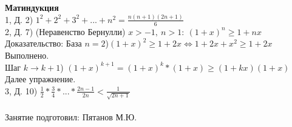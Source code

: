 \documentclass[a4paper]{article}
\begin{document}
\textbf{Матиндукция}\\
1, Д. 2) $1^2 + 2^2 + 3^2 + ... + n^2 = \frac{n(n+1)(2n+1)}{6}$\\
2, Д. 7) (Неравенство Бернулли) $x > -1,\ n > 1 :\ (1+x)^n \geqslant 1+nx$\\
Доказательство:
База $n=2$)$(1+x)^2 \geqslant 1+2x \Leftrightarrow 1+2x+x^2 \geqslant 1+2x$ Выполнено.\\
Шаг $k \xrightarrow \ k+1$) $(1+x)^{k+1} = (1+x)^k*(1+x) \geqslant (1+kx)(1+x)$ Далее упражнение.\\
3, Д. 10) $\frac{1}{2}*\frac{3}{4}*...*\frac{2n-1}{2n} < \frac{1}{\sqrt{2n+1}}$\\\\
Занятие подготовил: Пятанов М.Ю.
\end{document}
